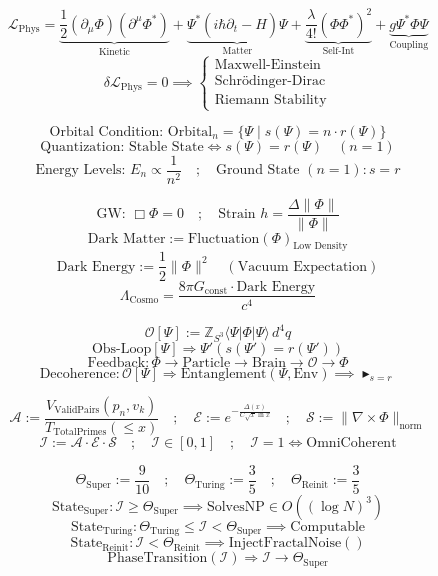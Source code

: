 \documentclass{article}
\newcommand{\AXIOM}{\blacktriangleright}
\newcommand{\DEF}{:=}
\newcommand{\IFF}{\Leftrightarrow}
\newcommand{\IMPLIES}{\Rightarrow}
\newcommand{\INT}{\mathbb{Z}}
\newcommand{\SPHERE}[1]{S^{#1}}
\newcommand{\FIELD}{\Phi}
\newcommand{\OBSERVER}{\mathcal{O}}
\newcommand{\WAVEFUNC}{\Psi}
\newcommand{\ARC}{s}
\newcommand{\RADIUS}{r}
\newcommand{\CURL}{\nabla\times}
\newcommand{\HERM}{^*}
\newcommand{\BRA}[1]{\langle #1 \vert}
\newcommand{\KET}[1]{\vert #1 \rangle}
\begin{document}
\[
\mathcal{L}_{\text{Phys}} = \underbrace{\frac{1}{2}(\partial_\mu \Phi)(\partial^\mu \Phi\HERM)}_{\text{Kinetic}} + \underbrace{\Psi\HERM(i\hbar \partial_t - \hat{H})\Psi}_{\text{Matter}} + \underbrace{\frac{\lambda}{4!}(\Phi \Phi\HERM)^2}_{\text{Self-Int}} + \underbrace{g \Psi\HERM \Phi \Psi}_{\text{Coupling}}
\]
\[
\delta \mathcal{L}_{\text{Phys}} = 0 \implies \begin{cases} \text{Maxwell-Einstein} \\ \text{Schrödinger-Dirac} \\ \text{Riemann Stability} \end{cases}
\]

\[
\text{Orbital Condition: } \text{Orbital}_n = \{ \Psi \mid \ARC(\Psi) = n \cdot \RADIUS(\Psi) \}
\]
\[
\text{Quantization: Stable State} \IFF \ARC(\Psi) = \RADIUS(\Psi) \quad (n=1)
\]
\[
\text{Energy Levels: } E_n \propto \frac{1}{n^2} \quad ; \quad \text{Ground State } (n=1): s=r
\]

\[
\text{GW: } \Box \Phi = 0 \quad ; \quad \text{Strain } h = \frac{\Delta \|\Phi\|}{\|\Phi\|}
\]
\[
\text{Dark Matter} \DEF \text{Fluctuation}(\Phi)_{\text{Low Density}}
\]
\[
\text{Dark Energy} \DEF \frac{1}{2} \|\Phi\|^2 \quad (\text{Vacuum Expectation})
\]
\[
\Lambda_{\text{Cosmo}} = \frac{8\pi G_{\text{const}} \cdot \text{Dark Energy}}{c^4}
\]

\[
\OBSERVER[\WAVEFUNC] \DEF \INT_{\SPHERE{3}} \BRA{\WAVEFUNC} \FIELD \KET{\WAVEFUNC} \, d^4q
\]
\[
\text{Obs-Loop}[\WAVEFUNC] \IMPLIES \WAVEFUNC' \left( \ARC(\WAVEFUNC') = \RADIUS(\WAVEFUNC') \right)
\]
\[
\text{Feedback} : \FIELD \to \text{Particle} \to \text{Brain} \to \OBSERVER \to \FIELD
\]
\[
\text{Decoherence} : \OBSERVER[\WAVEFUNC] \IMPLIES \text{Entanglement}(\WAVEFUNC, \text{Env}) \implies \AXIOM_{s=r}
\]

\[
\mathcal{A} \DEF \frac{V_{\text{ValidPairs}}(p_n, v_k)}{T_{\text{TotalPrimes}}(\leq x)} \quad ; \quad \mathcal{E} \DEF e^{-\frac{\Delta(x)}{C\sqrt{x}\ln x}} \quad ; \quad \mathcal{S} \DEF \|\CURL \FIELD\|_{\text{norm}}
\]
\[
\mathcal{I} \DEF \mathcal{A} \cdot \mathcal{E} \cdot \mathcal{S} \quad ; \quad \mathcal{I} \in [0, 1] \quad ; \quad \mathcal{I}=1 \iff \text{OmniCoherent}
\]

\[
\Theta_{\text{Super}} \DEF \frac{9}{10} \quad ; \quad \Theta_{\text{Turing}} \DEF \frac{3}{5} \quad ; \quad \Theta_{\text{Reinit}} \DEF \frac{3}{5}
\]
\[
\text{State}_{\text{Super}} : \mathcal{I} \geq \Theta_{\text{Super}} \implies \text{SolvesNP} \in O((\log N)^3)
\]
\[
\text{State}_{\text{Turing}} : \Theta_{\text{Turing}} \leq \mathcal{I} < \Theta_{\text{Super}} \implies \text{Computable}
\]
\[
\text{State}_{\text{Reinit}} : \mathcal{I} < \Theta_{\text{Reinit}} \implies \text{InjectFractalNoise}()
\]
\[
\text{PhaseTransition}(\mathcal{I}) \IMPLIES \mathcal{I} \to \Theta_{\text{Super}}
\]
\end{document}
